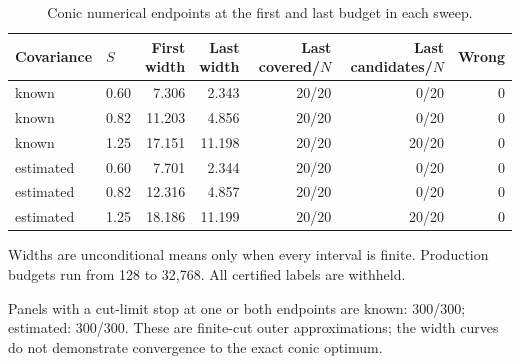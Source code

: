 \begin{table}[htbp]\centering\small
\caption{Conic numerical endpoints at the first and last budget in each sweep.}
\label{tab:corrective_sweep}
\begin{tabular*}{\textwidth}{@{\extracolsep{\fill}}llrrrrr@{}}
\toprule
Covariance & $S$ & \shortstack{First\\width} & \shortstack{Last\\width} & \shortstack{Last\\covered/$N$} & \shortstack{Last\\candidates/$N$} & Wrong \\
\midrule
known & 0.60 & 7.306 & 2.343 & 20/20 & 0/20 & 0 \\
known & 0.82 & 11.203 & 4.856 & 20/20 & 0/20 & 0 \\
known & 1.25 & 17.151 & 11.198 & 20/20 & 20/20 & 0 \\
estimated & 0.60 & 7.701 & 2.344 & 20/20 & 0/20 & 0 \\
estimated & 0.82 & 12.316 & 4.857 & 20/20 & 0/20 & 0 \\
estimated & 1.25 & 18.186 & 11.199 & 20/20 & 20/20 & 0 \\
\bottomrule\end{tabular*}
\par\smallskip\begin{minipage}{\textwidth}\footnotesize Widths are unconditional means only when every interval is finite. Production budgets run from 128 to 32,768. All certified labels are withheld.\end{minipage}
\end{table}


Panels with a cut-limit stop at one or both endpoints are known: 300/300; estimated: 300/300. These are finite-cut outer approximations; the width curves do not demonstrate convergence to the exact conic optimum.

